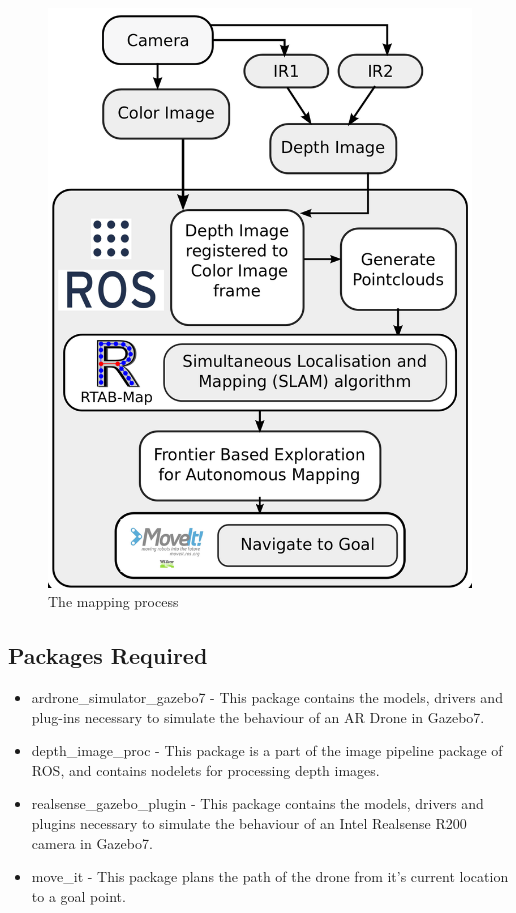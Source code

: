 \documentclass[a4paper,12pt,oneside]{book}
\begin{document}
\begin{figure}[h]
	\centering
	\includegraphics[scale=0.3]{process}
	\caption{The mapping process}
\end{figure}

\subsection*{Packages Required}
\begin{itemize}
	\item ardrone\_simulator\_gazebo7 - This package contains the models, drivers and plug-ins necessary to simulate the behaviour of an AR Drone in Gazebo7. 

	\item depth\_image\_proc - This package is a part of the image pipeline package of ROS, and contains nodelets for processing depth images.
		
	\item realsense\_gazebo\_plugin	- This package contains the models, drivers and plugins necessary to simulate the behaviour of an Intel Realsense R200 camera in Gazebo7.
		
	\item move\_it - This package plans the path of the drone from it's current location to a goal point.		
		
\end{itemize}
\end{document}
